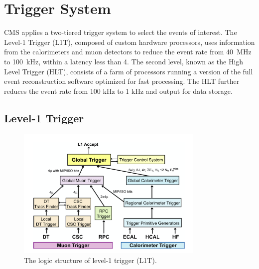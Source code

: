 \section{Trigger System}
\label{sec:cmsExperiment:trigger}

CMS applies a two-tiered trigger system \cite{cms:trigger:Khachatryan:2016bia} to select the events of interest. The  Level-1 Trigger (L1T), composed of custom hardware processors, uses information from the calorimeters and muon detectors to reduce the event rate from 40~MHz to 100~kHz, within a latency less than 4\mus. The second level, known as the High Level Trigger (HLT), consists of a farm of processors running a version of the full event reconstruction software optimized for fast processing. The HLT further reduces the event rate from 100 kHz to 1 kHz and output for data storage.



\subsection{Level-1 Trigger}

\begin{figure}[ht]
    \centering
    \includegraphics[width=0.8\textwidth]{chapters/CMSExperiment/sectionTrigger/figures/trigger.png}
    \caption{The logic structure of level-1 trigger (L1T).}
    \label{fig:cmsExperiment:trigger:structure}
\end{figure}

